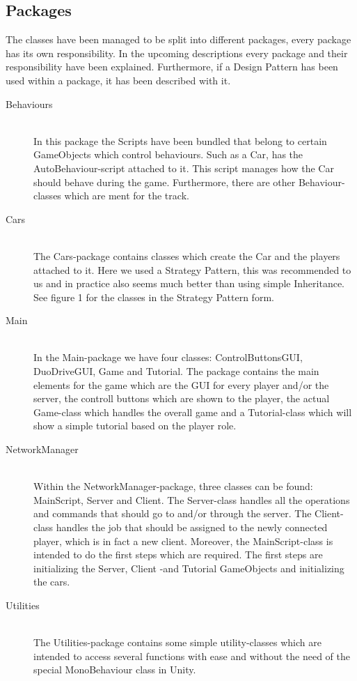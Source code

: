 \documentclass[11pt,twoside,a4paper]{article}
\begin{document}
\subsection{Packages}
The classes have been managed to be split into different packages, every package has its own responsibility. In the upcoming descriptions every package and their responsibility have been explained. Furthermore, if a Design Pattern has been used within a package, it has been described with it.

\begin{description}
\item[Behaviours] \hfill \\
    In this package the Scripts have been bundled that belong to certain GameObjects which control behaviours. Such as a Car, has the AutoBehaviour-script attached to it. This script manages how the Car should behave during the game. Furthermore, there are other Behaviour-classes which are ment for the track.
\item[Cars] \hfill \\
    The Cars-package contains classes which create the Car and the players attached to it. Here we used a Strategy Pattern, this was recommended to us and in practice also seems much better than using simple Inheritance. See figure 1 for the classes in the Strategy Pattern form.
\item[Main] \hfill \\
    In the Main-package we have four classes: ControlButtonsGUI, DuoDriveGUI, Game and Tutorial. The package contains the main elements for the game which are the GUI for every player and/or the server, the controll buttons which are shown to the player, the actual Game-class which handles the overall game and a Tutorial-class which will show a simple tutorial based on the player role.
\item[NetworkManager] \hfill \\
    Within the NetworkManager-package, three classes can be found: MainScript, Server and Client. The Server-class handles all the operations and commands that should go to and/or through the server. The Client-class handles the job that should be assigned to the newly connected player, which is in fact a new client. Moreover, the MainScript-class is intended to do the first steps which are required. The first steps are initializing the Server, Client -and Tutorial GameObjects and initializing the cars.
\item[Utilities] \hfill \\
    The Utilities-package contains some simple utility-classes which are intended to access several functions with ease and without the need of the special MonoBehaviour class in Unity.

\end{description}
\end{document}
